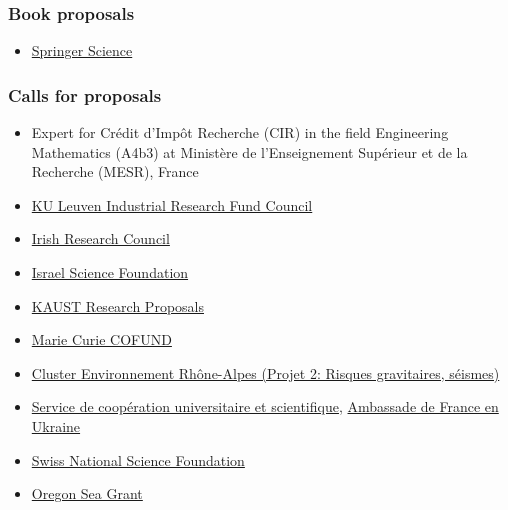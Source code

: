 \documentclass[final, a4paper, oneside, 12pt]{article}
\numberwithin{equation}{section}
\begin{document}
\subsubsection{Book proposals}

  \begin{itemize}
    \item \href{http://www.springer.com/}%
    {Springer Science}
  \end{itemize}

\subsubsection{Calls for proposals}

  \begin{itemize}

    \item Expert for Cr\'edit d'Imp\^ot Recherche (CIR) in the field Engineering Mathematics (A4b3) at Minist\`ere de l'Enseignement Sup\'erieur et de la Recherche (MESR), France

    \item \href{https://research.kuleuven.be/en/collaborate/science_business/iof/}%
    {KU Leuven Industrial Research Fund Council}
  
    \item \href{http://research.ie/}%
    {Irish Research Council}
    
    \item \href{https://www.isf.org.il/}%
    {Israel Science Foundation}
    
    \item \href{https://www.kaust.edu.sa/en}%
    {KAUST Research Proposals}
  
    \item \href{http://www.ulg.ac.be/cms/rv_2913816/en/about}%
    {Marie Curie COFUND}
    
    \item \href{http://www.cluster-environnement.net/le-programme-scientifique/les-projets}%
    {Cluster Environnement Rh\^one-Alpes (Projet 2: Risques gravitaires, s\'eismes)}
    
    \item \href{http://ambafrance-ua.org/spip.php?article1409}%
    {Service de coop\'eration universitaire et scientifique}, \href{http://ambafrance-ua.org/spip.php?article1409}%
    {Ambassade de France en Ukraine}

    \item \href{https://www.snf.ch/en/}%
    {Swiss National Science Foundation}
    
    \item \href{http://seagrant.oregonstate.edu/}%
    {Oregon Sea Grant}
    
  \end{itemize}
  
\end{document}
